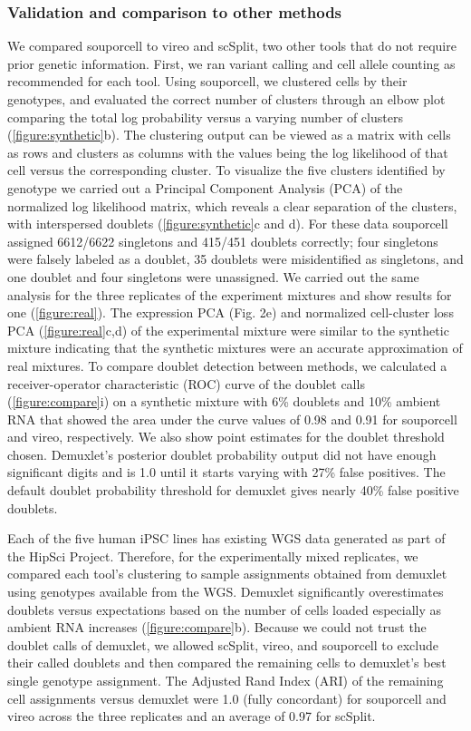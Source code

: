 \subsubsection{Validation and comparison to other methods}

We compared souporcell to vireo and scSplit, two other tools that do not require prior genetic information. First, we ran variant calling and cell allele counting as recommended for each tool. Using souporcell, we clustered cells by their genotypes, and evaluated the correct number of clusters through an elbow plot comparing the total log probability versus a varying number of clusters (\ref{figure:synthetic}b). The clustering output can be viewed as a matrix with cells as rows and clusters as columns with the values being the log likelihood of that cell versus the corresponding cluster. To visualize the five clusters identified by genotype we carried out a Principal Component Analysis (PCA) of the normalized log likelihood matrix, which reveals a clear separation of the clusters, with interspersed doublets (\ref{figure:synthetic}c and d).  For these data souporcell assigned 6612/6622 singletons and 415/451 doublets correctly; four singletons were falsely labeled as a doublet, 35 doublets were misidentified as singletons, and one doublet and four singletons were unassigned. We carried out the same analysis for the three replicates of the  experiment mixtures and show results for one (\ref{figure:real}). The expression PCA (Fig. 2e) and normalized cell-cluster loss PCA (\ref{figure:real}c,d) of the experimental mixture were similar to the synthetic mixture indicating that the synthetic mixtures were an accurate approximation of real mixtures. To compare doublet detection between methods, we calculated a receiver-operator characteristic (ROC) curve of the doublet calls (\ref{figure:compare}i) on a synthetic mixture with 6\% doublets and 10\% ambient RNA that showed the area under the curve values of 0.98 and 0.91 for souporcell and vireo, respectively. We also show point estimates for the doublet threshold chosen. Demuxlet's posterior doublet probability output did not have enough significant digits and is 1.0 until it starts varying with 27\% false positives. The default doublet probability threshold for demuxlet gives nearly 40\% false positive doublets.

\par{
Each of the five human iPSC lines has existing WGS data generated as part of the HipSci Project\cite{hipsci2}. Therefore, for the experimentally mixed replicates, we compared each tool's clustering to sample assignments obtained from demuxlet using genotypes available from the WGS. Demuxlet significantly overestimates doublets versus expectations based on the number of cells loaded\cite{10xsinglecell} especially as ambient RNA increases (\ref{figure:compare}b). Because we could not trust the doublet calls of demuxlet, we allowed scSplit, vireo, and souporcell to exclude their called doublets and then compared the remaining cells to demuxlet's best single genotype assignment. The Adjusted Rand Index (ARI) of the remaining cell assignments versus demuxlet were 1.0 (fully concordant) for souporcell and vireo across the three replicates and an average of 0.97 for scSplit.
}

